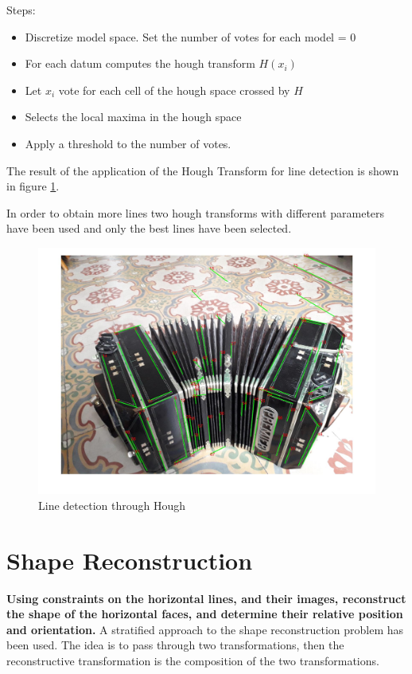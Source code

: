 \documentclass[11pt, oneside]{article}   	%
\begin{document}
Steps:

\begin{itemize}
\item Discretize model space. Set the number of votes for each model = 0
\item For each datum computes the hough transform $H(x_i)$
\item Let $x_i$ vote for each cell of the hough space crossed by $H$
\item Selects the local maxima in the hough space
\item Apply a threshold to the number of votes.
\end{itemize}

The result of the application of the Hough Transform for line detection is shown in figure \ref{hough}.

In order to obtain more lines two hough transforms with different parameters have been used and only the best lines have been selected.

\begin{figure}
\includegraphics[width=0.8\linewidth]{lines.jpg}

\caption{Line detection through Hough}
\label{hough}
\end{figure}

\section{Shape Reconstruction}
\textbf{Using constraints on the horizontal lines, and their images, reconstruct the shape of the horizontal faces, and determine their relative position and orientation.} \hfill \break
A stratified approach to the shape reconstruction problem has been used. The idea is to pass through two transformations, then the reconstructive transformation is the composition of the two transformations. 
\end{document}
